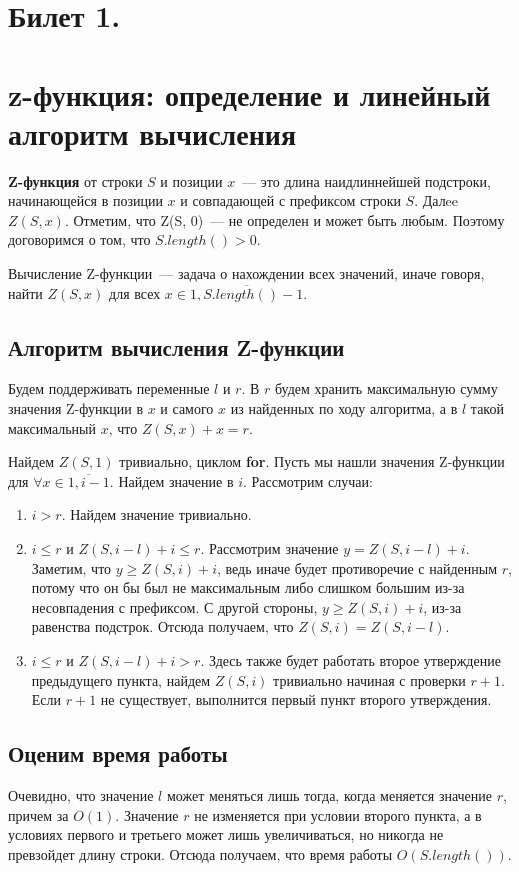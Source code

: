 \section{Билет 1.}
\section*{z-функция: определение и линейный алгоритм вычисления}
\par
\textbf{Z-функция} от строки $S$ и позиции $x$~--- это длина наидлиннейшей подстроки,
начинающейся в позиции $x$ и совпадающей с префиксом строки $S$. Далee $Z(S, x)$.
Отметим, что Z(S, 0)~--- не определен и может быть любым. Поэтому договоримся о том, что
$S.length() > 0$.

\par
Вычисление Z-функции~--- задача о нахождении всех значений, иначе говоря, найти
$Z(S, x)$ для всех $x \in \overline{1, S.length() - 1}$.

\subsection*{Алгоритм вычисления Z-функции}

Будем поддерживать переменные $l$ и $r$.
В $r$ будем хранить максимальную сумму значения Z-функции в $x$ и самого $x$ из найденных по ходу алгоритма,
а в $l$ такой максимальный $x$, что $Z(S, x) + x = r$.

\par
Найдем $Z(S, 1)$ тривиально, циклом \textbf{for}. Пусть мы нашли значения Z-функции
для $\forall x \in \overline{1, i - 1}$. Найдем значение в $i$. Рассмотрим случаи:

\begin{enumerate}
    \item $i > r$.
Найдем значение тривиально.
    \item $i \leq  r$ и $Z(S, i - l) + i \leq r$. Рассмотрим значение $y = Z(S, i - l) + i$.
Заметим, что $y \geq  Z(S, i) + i$, ведь иначе будет противоречие с найденным $r$, потому что он бы был не максимальным
либо слишком большим из-за несовпадения с префиксом. С другой стороны, $y \geq Z(S, i) + i$, из-за равенства подстрок.
Отсюда получаем, что $Z(S, i) = Z(S, i - l)$.
    \item $i \leq r$ и $Z(S, i - l) + i > r$. Здесь также будет работать второе утверждение предыдущего пункта, 
    найдем $Z(S, i)$ тривиально начиная с проверки $r+1$. Если $r+1$ не существует, выполнится первый пункт второго утверждения.
\end{enumerate}

\subsection*{Оценим время работы}
\par
Очевидно, что значение $l$ может меняться лишь тогда, когда меняется значение $r$, причем за $O(1)$.
Значение $r$ не изменяется при условии второго пункта, а в условиях первого и третьего может лишь увеличиваться,
но никогда не превзойдет длину строки. Отсюда получаем, что время работы $O(S.length())$.